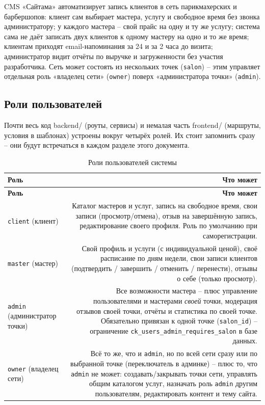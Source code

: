 CMS «Сайтама» автоматизирует запись клиентов в сеть парикмахерских и
барбершопов: клиент сам выбирает мастера, услугу и свободное время без
звонка администратору; у каждого мастера -- свой прайс на одну и ту же
услугу; система сама не даёт записать двух клиентов к одному мастеру на
одно и то же время; клиентам приходят email-напоминания за 24 и за 2 часа
до визита; администратор видит отчёты по выручке и загруженности без
участия разработчика. Сеть может состоять из нескольких точек
(\texttt{salon}) -- этим управляет отдельная роль «владелец сети»
(\texttt{owner}) поверх «администратора точки» (\texttt{admin}).

\subsection*{Роли пользователей}

Почти весь код backend/ (роуты, сервисы) и немалая часть frontend/
(маршруты, условия в шаблонах) устроены вокруг четырёх ролей. Их стоит
запомнить сразу -- они будут встречаться в каждом разделе этого документа.

\begin{xltabular}{\textwidth}{M D}
\caption{Роли пользователей системы} \\
\hline
\textbf{Роль} & \textbf{Что может} \\
\hline
\endfirsthead
\hline
\textbf{Роль} & \textbf{Что может} \\
\hline
\endhead
\hline
\endfoot
\texttt{client} (клиент) & Каталог мастеров и услуг, запись на свободное
  время, свои записи (просмотр/отмена), отзыв на завершённую запись,
  редактирование своего профиля. Роль по умолчанию при саморегистрации. \\
\texttt{master} (мастер) & Свой профиль и услуги (с индивидуальной ценой),
  своё расписание по дням недели, свои записи клиентов (подтвердить /
  завершить / отменить / перенести), отзывы о себе (только просмотр). \\
\texttt{admin} (администратор точки) & Все возможности мастера -- плюс
  управление пользователями и мастерами \emph{своей} точки, модерация
  отзывов своей точки, отчёты и статистика по своей точке. Обязательно
  привязан к одной точке (\texttt{salon_id}) -- ограничение
  \texttt{ck_users_admin_requires_salon} в базе данных. \\
\texttt{owner} (владелец сети) & Всё то же, что и \texttt{admin}, но по
  всей сети сразу или по выбранной точке (переключатель в админке) --
  плюс то, что \texttt{admin} не может: создавать/закрывать точки сети,
  управлять общим каталогом услуг, назначать роль \texttt{admin} другим
  пользователям, редактировать контент и тему сайта. \\
\end{xltabular}

